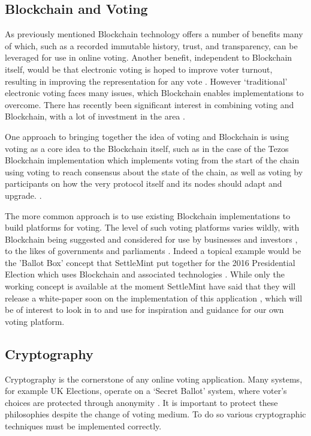 \documentclass{article}
\begin{document}
\subsection{Blockchain and Voting}

As previously mentioned Blockchain technology offers a number of benefits many of which, such as a recorded immutable history, trust, and transparency, can be leveraged for use in online voting. Another benefit, independent to Blockchain itself, would be that electronic voting is hoped to improve voter turnout, resulting in improving the representation for any vote \parencite{bchainpres:online}. However `traditional' electronic voting faces many issues, which Blockchain enables implementations to overcome. There has recently been significant interest in combining voting and Blockchain, with a lot of investment in the area \parencite{CoinDesk73:online, CoinDesk42:online}.
\par
One approach to bringing together the idea of voting and Blockchain is using voting as a core idea to the Blockchain itself, such as in the case of the Tezos Blockchain implementation which implements voting from the start of the chain using voting to reach consensus about the state of the chain, as well as voting by participants on how the very protocol itself and its nodes should adapt and upgrade. \parencite{TezosAse64:online}. 
\par
The more common approach is to use existing Blockchain implementations to build platforms for voting. The level of such voting platforms varies wildly, with Blockchain being suggested and considered for use by businesses and investors \parencite{Delaware81:online}, to the likes of governments and parliaments \parencite{USPresid50:online, CoinDesk74:online}. Indeed a topical example would be the 'Ballot Box' concept that SettleMint put together for the 2016 Presidential Election which uses Blockchain and associated technologies \parencite{USPresid50:online}. While only the working concept is available at the moment SettleMint have said that they will release a white-paper soon on the implementation of this application \parencite{SettleMi18:online}, which will be of interest to look in to and use for inspiration and guidance for our own voting platform.

\subsection{Cryptography}

Cryptography is the cornerstone of any online voting application. Many systems, for example UK Elections, operate on a `Secret Ballot' system, where voter's choices are protected through anonymity \parencite{chartistssecretbalot:online}. It is important to protect these philosophies despite the change of voting medium. To do so various cryptographic techniques must be implemented correctly.
\end{document}
